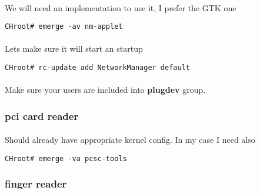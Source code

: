 \documentclass[10pt,a4paper]{article}
\begin{document}
                    \paragraph{} We will need an implementation to use it, I prefer the GTK one
                    
                    \begin{lstlisting}[style=BashInputCHRoot]
 CHroot# emerge -av nm-applet
                    \end{lstlisting}
                    
                    \paragraph{} Lets make sure it will start an startup
                    
                    \begin{lstlisting}[style=BashInputCHRoot]
 CHroot# rc-update add NetworkManager default
                    \end{lstlisting}
                    
                    \paragraph{} Make sure your users are included into \textbf{plugdev} group.
                    
                \newpage
                \subsubsection{pci card reader}
                    
                    \paragraph{} Should already have appropriate kernel config. In my case I need also
                     
                    \begin{lstlisting}[style=BashInputCHRoot]
 CHroot# emerge -va pcsc-tools
                    \end{lstlisting}
                    
                \newpage
                \subsubsection{finger reader}
                    
\end{document}
